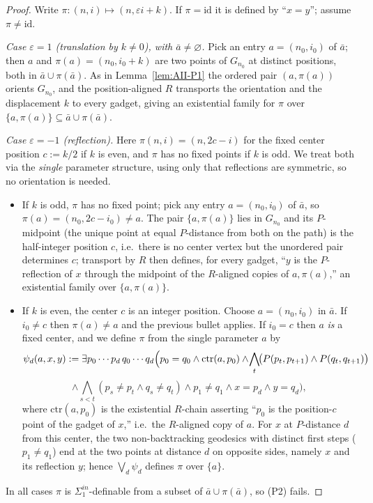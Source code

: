 \documentclass[12pt,fullpage]{article}
\theoremstyle{definition}
\begin{document}
\begin{proof}
Write $\pi:(n,i)\mapsto(n,\varepsilon i+k)$.  If $\pi=\mathrm{id}$ it is defined
by ``$x=y$''; assume $\pi\neq\mathrm{id}$.

\smallskip
\emph{Case $\varepsilon=1$ (translation by $k\neq0$), with $\bar a\neq\varnothing$.}
Pick an entry $a=(n_0,i_0)$ of $\bar a$;
then $a$ and $\pi(a)=(n_0,i_0+k)$ are two points of $G_{n_0}$ at distinct
positions, both in $\bar a\cup\pi(\bar a)$.  As in Lemma~\ref{lem:AII-P1} the
ordered pair $(a,\pi(a))$ orients $G_{n_0}$, and the position-aligned $R$
transports the orientation and the displacement $k$ to every gadget, giving an
existential family for $\pi$ over $\{a,\pi(a)\}\subseteq\bar a\cup\pi(\bar a)$.

\smallskip
\emph{Case $\varepsilon=-1$ (reflection).}  Here $\pi(n,i)=(n,2c-i)$ for the
fixed center position $c:=k/2$ if $k$ is even, and $\pi$ has no fixed points if
$k$ is odd.  We treat both via the \emph{single} parameter structure, using only
that reflections are symmetric, so no orientation is needed.
\begin{itemize}
\item If $k$ is odd, $\pi$ has no fixed point; pick any entry $a=(n_0,i_0)$ of
  $\bar a$, so $\pi(a)=(n_0,2c-i_0)\neq a$.  The pair $\{a,\pi(a)\}$ lies in
  $G_{n_0}$ and its $P$-midpoint (the unique point at equal $P$-distance from
  both on the path) is the half-integer position $c$, i.e.\ there is no center
  vertex but the unordered pair determines $c$; transport by $R$ then defines,
  for every gadget, ``$y$ is the $P$-reflection of $x$ through the midpoint of
  the $R$-aligned copies of $a,\pi(a)$,'' an existential family over
  $\{a,\pi(a)\}$.
\item If $k$ is even, the center $c$ is an integer position.  Choose $a=(n_0,i_0)$
  in $\bar a$.  If $i_0\neq c$ then $\pi(a)\neq a$ and the previous bullet
  applies.  If $i_0=c$ then $a$ \emph{is} a fixed center, and we define $\pi$
  from the single parameter $a$ by
  \[
  \psi_d(a,x,y):=\exists p_0\cdots p_d\,q_0\cdots q_d\Bigl(
  p_0=q_0\wedge \mathrm{ctr}(a,p_0)\wedge\!\bigwedge_t\!\bigl(P(p_t,p_{t+1})\wedge P(q_t,q_{t+1})\bigr)
  \]
  \[
  \wedge\!\bigwedge_{s<t}\!(p_s\neq p_t\wedge q_s\neq q_t)\wedge p_1\neq q_1
  \wedge x=p_d\wedge y=q_d\Bigr),
  \]
  where $\mathrm{ctr}(a,p_0)$ is the existential $R$-chain asserting ``$p_0$ is
  the position-$c$ point of the gadget of $x$,'' i.e.\ the $R$-aligned copy of
  $a$.  For $x$ at $P$-distance $d$ from this center, the two non-backtracking
  geodesics with distinct first steps ($p_1\neq q_1$) end at the two points at
  distance $d$ on opposite sides, namely $x$ and its reflection $y$; hence
  $\bigvee_d\psi_d$ defines $\pi$ over $\{a\}$.
\end{itemize}

In all cases $\pi$ is $\Sigma^{in}_1$-definable from a subset of
$\bar a\cup\pi(\bar a)$, so (P2) fails.
\end{proof}
\end{document}
